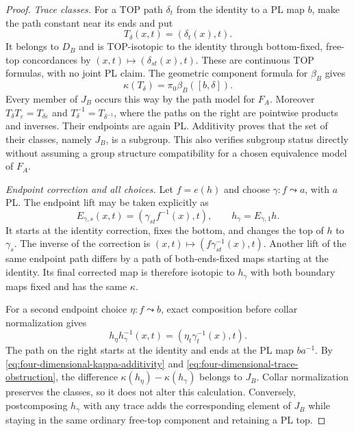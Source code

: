 \begin{proof}
\emph{Trace classes.}
For a TOP path $\delta_t$ from the identity to a PL map $b$, make
the path constant near its ends and put
\[
 T_\delta(x,t)=(\delta_t(x),t).
\]
It belongs to $D_B$ and is TOP-isotopic to the identity through
bottom-fixed, free-top concordances by
$(x,t)\mapsto(\delta_{st}(x),t)$.  These are continuous TOP
formulas, with no joint PL claim.  The geometric component formula
for $\beta_B$ gives
\begin{equation}\label{eq:four-dimensional-trace-obstruction}
 \kappa(T_\delta)=\pi_0\beta_B([b,\delta]).
\end{equation}
Every member of $J_B$ occurs this way by the path model for $F_A$.
Moreover $T_\delta T_\varepsilon=T_{\delta\varepsilon}$ and
$T_\delta^{-1}=T_{\delta^{-1}}$, where the paths on the right are
pointwise products and inverses.  Their endpoints are again PL.
Additivity proves that the set of their classes, namely $J_B$, is
a subgroup.  This also verifies subgroup status directly without
assuming a group structure compatibility for a chosen equivalence
model of $F_A$.

\emph{Endpoint correction and all choices.}
Let $f=e(h)$ and choose $\gamma:f\leadsto a$, with $a$ PL.
The endpoint lift may be taken explicitly as
\[
 E_{\gamma,s}(x,t)=(\gamma_{st}f^{-1}(x),t),\qquad
 h_\gamma=E_{\gamma,1}h.
\]
It starts at the identity correction, fixes the bottom, and changes
the top of $h$ to $\gamma_s$.  The inverse of the correction is
$(x,t)\mapsto(f\gamma_{st}^{-1}(x),t)$.  Another lift of the same
endpoint path differs by a path of both-ends-fixed maps starting
at the identity.  Its final corrected map is therefore isotopic
to $h_\gamma$ with both boundary maps fixed and has the same
$\kappa$.

For a second endpoint choice $\eta:f\leadsto b$, exact composition
before collar normalization gives
\[
 h_\eta h_\gamma^{-1}(x,t)=(\eta_t\gamma_t^{-1}(x),t).
\]
The path on the right starts at the identity and ends at the PL
map $ba^{-1}$.  By \eqref{eq:four-dimensional-kappa-additivity}
and \eqref{eq:four-dimensional-trace-obstruction}, the difference
$\kappa(h_\eta)-\kappa(h_\gamma)$ belongs to $J_B$.
Collar normalization preserves the classes, so it does not alter
this calculation.  Conversely, postcomposing $h_\gamma$ with any
trace adds the corresponding element of $J_B$ while staying in the
same ordinary free-top component and retaining a PL top.


\end{proof}
